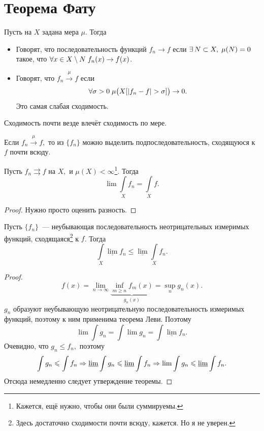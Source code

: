 \documentclass{notes}
\begin{document}
\section{Теорема Фату}

	\begin{de}
		Пусть на $X$ задана мера $\mu$. Тогда
		\begin{itemize}
			\item
			Говорят, что последовательность функций $f_n \to f$  если $\exists \, N \subset X, \; \mu(N) = 0$ такое, что $\forall x \in X \setminus N \; f_n(x) \to f(x)$.
			\item Говорят, что $f_n \xrightarrow{\mu} f$  если 
			\[
				\forall \sigma > 0 \; \mu\big(X[|f_n - f| > \sigma]\big) \to 0.
			\]
			Это самая слабая сходимость.
		\end{itemize}
	\end{de}

	\begin{thm}
		Сходимость почти везде влечёт сходимость по мере.
	\end{thm}

	\begin{thm}[Рисс]
		Если $f_n \xrightarrow{\mu} f,$ то из $\{f_n\}$ можно выделить подпоследовательность, сходящуюся к $f$ почти всюду.
	\end{thm}

	\begin{thm}
		Пусть $f_n \rightrightarrows f$ на $X,$ и $\mu(X) < \infty$\footnote{Кажется, ещё нужно, чтобы они были суммируемы.}. Тогда
		\[
			\lim \int\limits_X f_n = \int\limits_X f.
		\]
		\begin{proof}
			Нужно просто оценить разность.
		\end{proof}
	\end{thm}

	\begin{thm}[Фату]
		Пусть $\{f_n\}$~--- неубывающая последовательность неотрицательных измеримых функций, сходящаяся\footnote{Здесь достаточно сходимости почти всюду, кажется. Но я не уверен.} к $f$. Тогда
		\[
			\int\limits_X \underline{\lim} f_n \leqslant \underline{\lim} \int\limits_X  f_n.
		\]
		\begin{proof}
			\[
				f(x) = \lim_{n \to \infty} \underbrace{\inf_{m \geqslant n} f_m(x)}_{g_n(x)} = \sup_{n} g_n(x).
			\]
			$g_n$ образуют неубывающую неотрицательную последовательность измеримых функций, поэтому к ним применима теорема Леви.
			Поэтому
			\[
				\lim \int g_n = \int \lim g_n = \int \underline{\lim} f_n.	
			\]
			Очевидно, что $g_n \leqslant f_n,$ поэтому
			\[
				\int g_n \leqslant \int f_n \Rightarrow \underline{\lim} \int g_n \leqslant \underline{\lim} \int f_n \Rightarrow \lim \int g_n \leqslant \underline{\lim} \int f_n.
			\]
			Отсюда немедленно следует утверждение теоремы.
		\end{proof}
	\end{thm}
\end{document}
